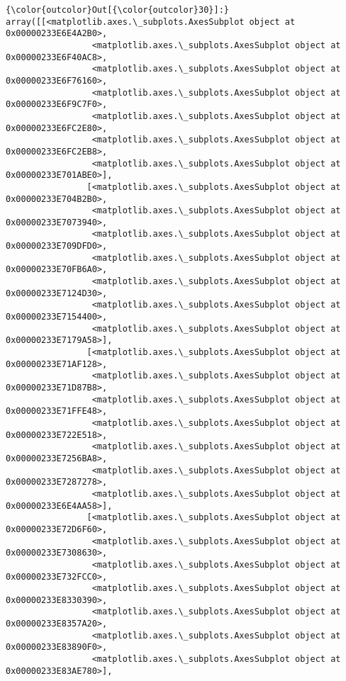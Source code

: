 \documentclass[11pt]{article}
\begin{document}
\begin{Verbatim}[commandchars=\\\{\}]
{\color{outcolor}Out[{\color{outcolor}30}]:} array([[<matplotlib.axes.\_subplots.AxesSubplot object at 0x00000233E6E4A2B0>,
                 <matplotlib.axes.\_subplots.AxesSubplot object at 0x00000233E6F40AC8>,
                 <matplotlib.axes.\_subplots.AxesSubplot object at 0x00000233E6F76160>,
                 <matplotlib.axes.\_subplots.AxesSubplot object at 0x00000233E6F9C7F0>,
                 <matplotlib.axes.\_subplots.AxesSubplot object at 0x00000233E6FC2E80>,
                 <matplotlib.axes.\_subplots.AxesSubplot object at 0x00000233E6FC2EB8>,
                 <matplotlib.axes.\_subplots.AxesSubplot object at 0x00000233E701ABE0>],
                [<matplotlib.axes.\_subplots.AxesSubplot object at 0x00000233E704B2B0>,
                 <matplotlib.axes.\_subplots.AxesSubplot object at 0x00000233E7073940>,
                 <matplotlib.axes.\_subplots.AxesSubplot object at 0x00000233E709DFD0>,
                 <matplotlib.axes.\_subplots.AxesSubplot object at 0x00000233E70FB6A0>,
                 <matplotlib.axes.\_subplots.AxesSubplot object at 0x00000233E7124D30>,
                 <matplotlib.axes.\_subplots.AxesSubplot object at 0x00000233E7154400>,
                 <matplotlib.axes.\_subplots.AxesSubplot object at 0x00000233E7179A58>],
                [<matplotlib.axes.\_subplots.AxesSubplot object at 0x00000233E71AF128>,
                 <matplotlib.axes.\_subplots.AxesSubplot object at 0x00000233E71D87B8>,
                 <matplotlib.axes.\_subplots.AxesSubplot object at 0x00000233E71FFE48>,
                 <matplotlib.axes.\_subplots.AxesSubplot object at 0x00000233E722E518>,
                 <matplotlib.axes.\_subplots.AxesSubplot object at 0x00000233E7256BA8>,
                 <matplotlib.axes.\_subplots.AxesSubplot object at 0x00000233E7287278>,
                 <matplotlib.axes.\_subplots.AxesSubplot object at 0x00000233E6E4AA58>],
                [<matplotlib.axes.\_subplots.AxesSubplot object at 0x00000233E72D6F60>,
                 <matplotlib.axes.\_subplots.AxesSubplot object at 0x00000233E7308630>,
                 <matplotlib.axes.\_subplots.AxesSubplot object at 0x00000233E732FCC0>,
                 <matplotlib.axes.\_subplots.AxesSubplot object at 0x00000233E8330390>,
                 <matplotlib.axes.\_subplots.AxesSubplot object at 0x00000233E8357A20>,
                 <matplotlib.axes.\_subplots.AxesSubplot object at 0x00000233E83890F0>,
                 <matplotlib.axes.\_subplots.AxesSubplot object at 0x00000233E83AE780>],

\end{Verbatim}
\end{document}
